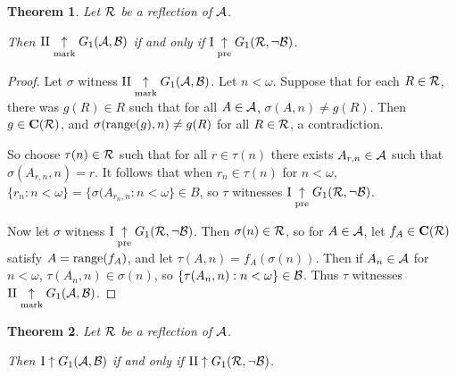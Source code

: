 \documentclass{amsart}
\theoremstyle{plain}
\newtheorem{theorem}{Theorem}
\theoremstyle{definition}
\theoremstyle{remark}
\theoremstyle{plain}
\theoremstyle{definition}
\theoremstyle{remark}
\begin{document}
\begin{theorem}
  Let \(\mathcal{R}\) be a reflection of \(\mathcal{A}\). 

  Then
  \(\mathrm{II}\underset{\text{mark}}{\uparrow}G_{1}(\mathcal{A},\mathcal{B})\) if and only if
  \(\mathrm{I}\underset{\text{pre}}{\uparrow}G_{1}(\mathcal{R},\neg\mathcal{B})\).
\end{theorem}

\begin{proof}
  Let \(\sigma\) witness 
  \(\mathrm{II}\underset{\text{mark}}{\uparrow}G_{1}(\mathcal{A},\mathcal{B})\).
  Let \(n<\omega\). Suppose that for each \(R\in\mathcal{R}\),
  there was \(g(R)\in R\) such that for all \(A\in \mathcal{A}\),
  \(\sigma(A,n)\not=g(R)\). Then \(g\in\mathbf C(\mathcal{R})\),
  and \(\sigma(\text{range}(g),n)\not=g(R)\) for all \(R\in\mathcal{R}\),
  a contradiction.

  So choose \(\tau(n)\in\mathcal{R}\) such that for all \(r\in \tau(n)\)
  there exists \(A_{r,n}\in\mathcal{A}\) such that \(\sigma(A_{r,n},n)=r\).
  It follows that when \(r_n\in\tau(n)\) for \(n<\omega\),
  \(\{r_n:n<\omega\}=\{\sigma(A_{r_n,n}:n<\omega\}\in B\),
  so \(\tau\) witnesses
  \(\mathrm{I}\underset{\text{pre}}{\uparrow}G_{1}(\mathcal{R},\neg\mathcal{B})\).

  Now let \(\sigma\) witness 
  \(\mathrm{I}\underset{\text{pre}}{\uparrow}G_{1}(\mathcal{R},\neg\mathcal{B})\).
  Then \(\sigma(n)\in\mathcal{R}\), so for \(A\in\mathcal{A}\), let
  \(f_A\in\mathbf C(\mathcal{R})\) satisfy \(A=\text{range}(f_A)\),
  and let \(\tau(A,n)=f_A(\sigma(n))\).
  Then if \(A_n\in\mathcal{A}\) for \(n<\omega\), \(\tau(A_n,n)\in\sigma(n)\),
  so \(\{\tau(A_n,n):n<\omega\}\in\mathcal{B}\).
  Thus \(\tau\) witnesses
  \(\mathrm{II}\underset{\text{mark}}{\uparrow}G_{1}(\mathcal{A},\mathcal{B})\).
\end{proof}

\begin{theorem}
  Let \(\mathcal{R}\) be a reflection of \(\mathcal{A}\). 

  Then
  \(\mathrm{I}\uparrow G_{1}(\mathcal{A},\mathcal{B})\) if and only if
  \(\mathrm{II}\uparrow G_{1}(\mathcal{R},\neg\mathcal{B})\).
\end{theorem}
\end{document}
